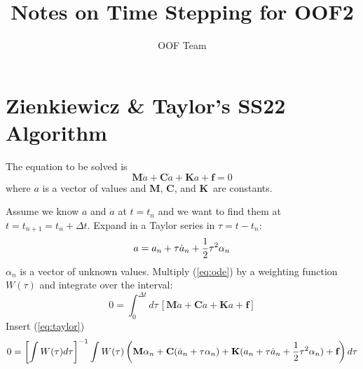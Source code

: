 \documentclass[onecolumn,prl,floatfix,12pt]{revtex4}
\newcommand{\M}{\textbf{M}}
\newcommand{\C}{\textbf{C}}
\newcommand{\K}{\textbf{K}}
\newcommand{\f}{\textbf{f}}
\newcommand{\half}{{1\over2}}
\begin{document}
\title{Notes on Time Stepping for OOF2}

\author{OOF Team}

\maketitle

\section{Zienkiewicz \& Taylor's SS22 Algorithm}

The equation to be solved is
\begin{equation}
  \label{eq:ode}
  \M \ddot a + \C \dot a + \K a + \f = 0
\end{equation}
where $a$ is a vector of values and \M, \C, and \K\ are constants.

Assume we know $a$ and $\dot a$ at $t=t_n$ and we want to find them at
$t=t_{n+1} = t_n + \Delta t$.  Expand in a Taylor series in $\tau =
t-t_n$:
\begin{equation}
  \label{eq:taylor}
  a = a_n + \tau\dot a_n + \half\tau^2\alpha_n
\end{equation}
$\alpha_n$ is a vector of unknown values.
Multiply (\ref{eq:ode}) by a weighting function $W(\tau)$ and integrate
over the interval:
\begin{equation}
  \label{eq:weighted}
  0=\int_0^{\Delta t}d\tau\, \left[\M \ddot a + \C \dot a + \K a + \f\right]
\end{equation}
Insert (\ref{eq:taylor})
\begin{equation}
  \label{eq:w1}
0 = \left[\int W(\tau)d\tau\right]^{-1}\int W(\tau)\left(\M \alpha_n + \C
  (\dot a_n + \tau \alpha_n) + \K(a_n + \tau\dot a_n + \half
  \tau^2\alpha_n)+ \f
 \right) d\tau
\end{equation}
\end{document}

